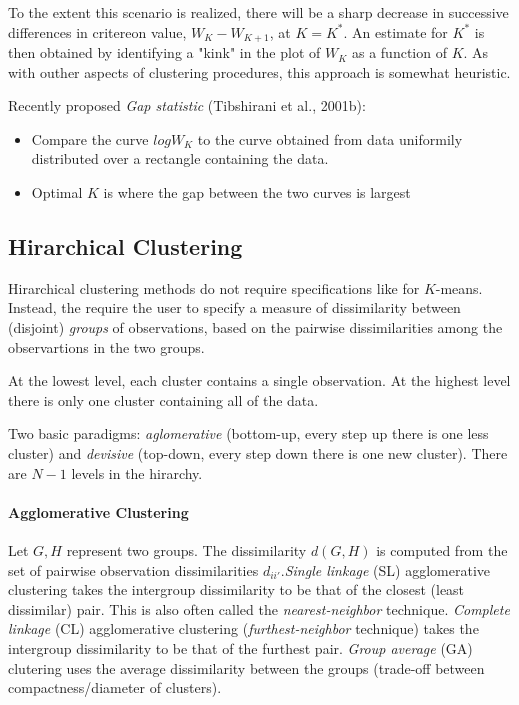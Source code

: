 To the extent this scenario is realized, there will be a sharp decrease in successive differences in critereon value, \(W_K - W_{K+1}\), at \(K=K^*\). An estimate for \(K^*\) is then obtained by identifying a "kink" in the plot of \(W_K\) as a function of \(K\). As with outher aspects of clustering procedures, this approach is somewhat heuristic.

Recently proposed \textit{Gap statistic} (Tibshirani et al., 2001b):
\begin{itemize}
    \item
        Compare the curve \(log W_K\) to the curve obtained from data uniformily distributed over a rectangle containing the data.
    \item
        Optimal \(K\) is where the gap between the two curves is largest
\end{itemize}

\subsection*{Hirarchical Clustering}
Hirarchical clustering methods do not require specifications like for \(K\)-means. Instead, the require the user to specify a measure of dissimilarity between (disjoint) \textit{groups} of observations, based on the pairwise dissimilarities among the observartions in the two groups.

At the lowest level, each cluster contains a single observation. At the highest level there is only one cluster containing all of the data.

Two basic paradigms: \textit{aglomerative} (bottom-up, every step up there is one less cluster) and \textit{devisive} (top-down, every step down there is one new cluster). There are \(N-1\) levels in the hirarchy.

\paragraph{Agglomerative Clustering}
Let \(G, H\) represent two groups. The dissimilarity \(d(G,H)\) is computed from the set of pairwise observation dissimilarities \(d_{ii'}\).\textit{Single linkage} (SL) agglomerative clustering takes the intergroup dissimilarity to be that of the closest (least dissimilar) pair. This is also often called the \textit{nearest-neighbor} technique. \textit{Complete linkage} (CL) agglomerative clustering (\textit{furthest-neighbor} technique) takes the intergroup dissimilarity to be that of the furthest pair. \textit{Group average} (GA) clutering uses the average dissimilarity between the groups (trade-off between compactness/diameter of clusters).

